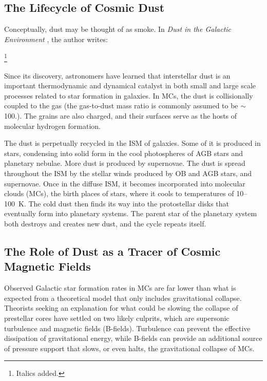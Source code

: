 \subsection{The Lifecycle of Cosmic Dust}

Conceptually, dust may be thought of as smoke. In \textit{Dust in the Galactic Environment} \citep{whittet2002dust}, the author writes:

\footnote{Italics added.}

Since its discovery, astronomers have learned that interstellar dust is an important thermodynamic and dynamical catalyst in both small and large scale processes related to star formation in galaxies. In MCs, the dust is collisionally coupled to the gas (the gas-to-dust mass ratio is commonly assumed to be $\sim$100.). The grains are also charged, and their surfaces serve as the hosts of molecular hydrogen formation.

The dust is perpetually recycled in the ISM of galaxies. Some of it is produced in stars, condensing into solid form in the cool  photospheres of AGB stars and planetary nebulae. More dust is produced by supernovae. The dust is spread throughout the ISM by the stellar winds produced by OB and AGB stars, and supernovae. Once in the diffuse ISM, it becomes incorporated into molecular clouds (MCs), the birth places of stars, where it cools to temperatures of 10--100~K. The cold dust then finds its way into the protostellar disks that eventually form into planetary systems. The parent star of the planetary system both destroys and creates new dust, and the cycle repeats itself.

\subsection{The Role of Dust as a Tracer of Cosmic Magnetic Fields}

Observed Galactic star formation rates in MCs are far lower than what is expected from a theoretical model that only includes gravitational collapse. Theorists seeking an explanation for what could be slowing the collapse of prestellar cores have settled on two likely culprits, which are supersonic turbulence and magnetic fields (B-fields). Turbulence can prevent the effective dissipation of gravitational energy, while B-fields can provide an additional source of pressure support that slows, or even halts, the gravitational collapse of MCs.

